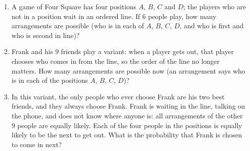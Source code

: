 \begin{enumerate}
\item[(a)] A game of Four Square has four positions $A$, $B$, $C$ and $D$; the players who are not in a position wait in an ordered line. If $6$ people play, how many arrangements are possible (who is in each of $A$, $B$, $C$, $D$, and who is first and who is second in line)?
\item[(b)] Frank and his $9$ friends play a variant: when a player gets out, that player chooses who comes in from the line, so the order of the line no longer matters. How many arrangements are possible now (an arrangement says who is in each of the positions $A$, $B$, $C$, $D$)?
\item[(c)] In this variant, the only people who ever choose Frank are his two best friends, and they always choose Frank. Frank is waiting in the line, talking on the phone, and does not know where anyone is: all arrangements of the other $9$ people are equally likely. Each of the four people in the positions is equally likely to be the next to get out. What is the probability that Frank is chosen to come in next?
\end{enumerate}
